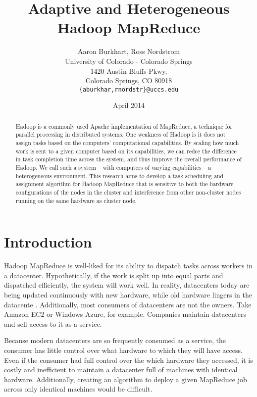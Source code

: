 \documentclass{sig-alternate}
\begin{document}
\title{Adaptive and Heterogeneous Hadoop MapReduce}
\author{Aaron Burkhart, Ross Nordstrom\\
        University of Colorado - Colorado Springs\\
        1420 Austin Bluffs Pkwy,\\
        Colorado Springs, CO 80918\\
        \texttt{\{aburkhar,rnordstr\}@uccs.edu}
       }
\date{April 2014}
\def\copyrtyr{2014}

\maketitle

\begin{abstract}
Hadoop is a commonly used Apache implementation of MapReduce, a technique for
parallel processing in distributed systems. One weakness of Hadoop is it does
not assign tasks based on the computers’ computational capabilities. By scaling
how much work is sent to a given computer based on its capabilities, we can
redce the difference in task completion time across the system, and thus improve
the overall performance of Hadoop. We call such a system – with computers of
varying capabilities – a heterogeneous environment. This research aims to develop
a task scheduling and assignment algorithm for Hadoop MapReduce that is sensitive 
to both the hardware configurations of the nodes in the cluster and interference
from other non-cluster nodes running on the same hardware as cluster node.
\end{abstract}


\section{Introduction}
Hadoop MapReduce is well-liked for its ability to dispatch tasks across workers
in a datacenter. Hypothetically, if the work is split up into equal parts and dispatched
efficiently, the system will work well. In reality, datacenters today are being
updated continuously with new hardware, while old hardware lingers in the datacente
. Additionally, most consumers of datacenters are not the owners. Take Amazon EC2
or Windows Azure, for example. Companies maintain datacenters and sell access to
it as a service. 

Because modern datacenters are so frequently consumed as a service, the consumer
has little control over what hardware to which they will have access. Even if the
consumer had full control over the which hardware they accessed, it is costly and
inefficient to maintain a datacenter full of machines with identical hardware. 
Additionally, creating an algorithm to deploy a given MapReduce job across only 
identical machines would be difficult.
\end{document}
